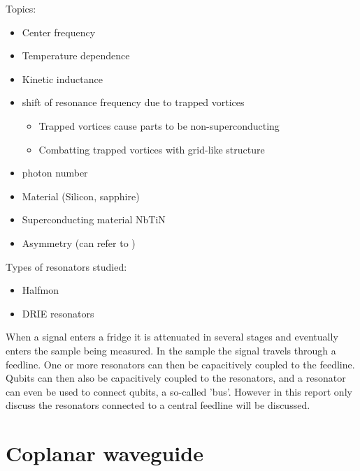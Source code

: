 \documentclass[12pt]{report}
\begin{document}

Topics:
\begin{itemize}
    \item Center frequency
    \item Temperature dependence
    \item Kinetic inductance
    \item shift of resonance frequency due to trapped vortices
    \begin{itemize}
        \item Trapped vortices cause parts to be non-superconducting
        \item Combatting trapped vortices with grid-like structure
    \end{itemize}
    \item photon number
    \item Material (Silicon, sapphire)
    \item Superconducting material NbTiN
    \item Asymmetry (can refer to \cite[p.~192]{Geerlings})
\end{itemize}

Types of resonators studied:
\begin{itemize}
    \item Halfmon
    \item DRIE resonators
\end{itemize}


When a signal enters a fridge it is attenuated in several stages and eventually enters the sample being measured. In the sample the signal travels through a feedline. One or more resonators can then be capacitively coupled to the feedline. Qubits can then also be capacitively coupled to the resonators, and a resonator can even be used to connect qubits, a so-called 'bus'. However in this report only discuss the resonators connected to a central feedline will be discussed.









\section{Coplanar waveguide}
\end{document}
